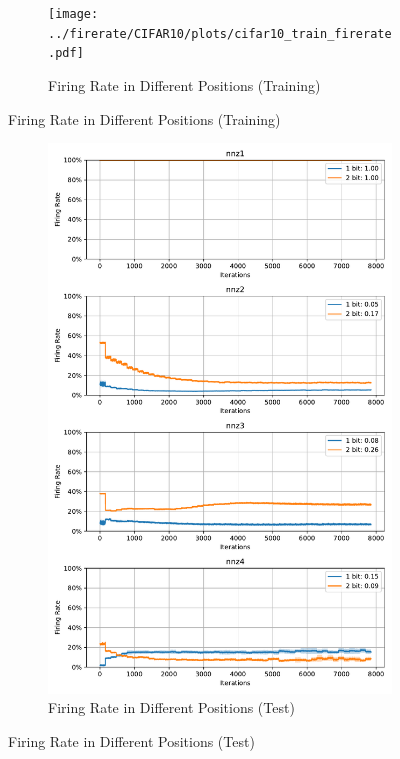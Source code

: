         \begin{figure}[H]
            \centering
            \begin{subfigure}[H]{\textwidth}
                \centering
                \texttt{[image: ../firerate/CIFAR10/plots/cifar10\_train\_firerate.pdf]}
                \caption{Firing Rate in Different Positions (Training)}
            \end{subfigure}
        \end{figure}
        \begin{figure}[H]
            \centering
            \ContinuedFloat
            \begin{subfigure}[H]{\textwidth}
                \centering
                \includegraphics[width=\textwidth]{../firerate/CIFAR10/plots/cifar10_test_firerate.pdf}
                \caption{Firing Rate in Different Positions (Test)}
            \end{subfigure}
        \end{figure}
